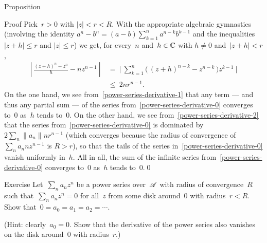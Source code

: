 \documentclass[a]{subfiles}
\begin{document}
\begin{parsec}
\begin{point}{Proposition}
\begin{point}{Proof}
Pick~$r>0$ with $\left|z\right| < r < R$.
With the appropriate algebraic gymnastics
(involving the identity
$a^n-b^n=(a-b)\sum_{k=1}^n a^{n-k}b^{k-1}$
and the inequalities $\left|z+h\right| \leq r$
and $\left|z\right|\leq r$)
we get, for every~$n$
and~$h\in \mathbb{C}$ with
$h\neq 0$ and~$\left|z+h\right|<r$,
\begin{align}
\left|\  \frac{(z+h)^n-z^n}{h}-nz^{n-1}\ \right|
\ &= \ 
\biggl|\ \sum_{k=1}^n \bigl(\,(z+h)^{n-k}-z^{n-k}\,\bigr)z^{k-1} \ \biggr|
\label{power-series-derivative-1}
\\ 
\label{power-series-derivative-2}
\ &\leq\ 
2nr^{n-1}.
\end{align}
On the one hand,
we see from~\eqref{power-series-derivative-1}
that any term
--- and thus any partial sum ---
of the series from~\eqref{power-series-derivative-0}
converges to~$0$ as~$h$ tends to~$0$.
On the other hand,
we see from~\eqref{power-series-derivative-2}
that the series 
from~\eqref{power-series-derivative-0}
is dominated by~$2\sum_n \|a_n\|nr^{n-1}$
(which converges
because the radius of convergence of $\sum_n a_n nz^{n-1}$
is $R>r$),
so that the tails of the series in~\eqref{power-series-derivative-0}
vanish uniformly in~$h$.
All in all, the sum of the infinite series
from~\eqref{power-series-derivative-0}
converges to~$0$ as~$h$ tends to~$0$.\qed
\end{point}
\end{point}
\begin{point}{Exercise}%
Let~$\sum_n a_n z^n$
be a power series over~$\mathscr{A}$
with radius of convergence~$R$
such that~$\sum_n a_n z^n=0$
for all~$z$ from
some disk around~$0$ with radius~$r<R$.
Show that~$0=a_0=a_1=a_2=\dotsb$.

(Hint: clearly~$a_0=0$.  Show that the derivative
of the power series also vanishes on the disk around~$0$
with radius~$r$.)
\end{point}
\end{parsec}%
\end{document}
